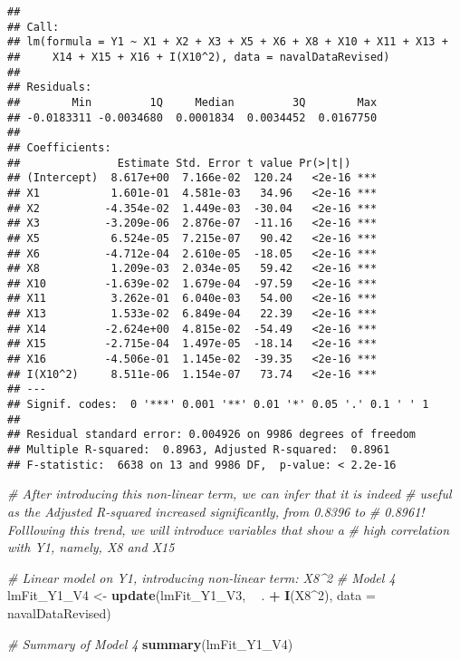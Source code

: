 \documentclass[
]{article}
\newenvironment{Shaded}{\begin{snugshade}}{\end{snugshade}}
\newcommand{\CommentTok}[1]{\textcolor[rgb]{0.56,0.35,0.01}{\textit{#1}}}
\newcommand{\DataTypeTok}[1]{\textcolor[rgb]{0.13,0.29,0.53}{#1}}
\newcommand{\DecValTok}[1]{\textcolor[rgb]{0.00,0.00,0.81}{#1}}
\newcommand{\KeywordTok}[1]{\textcolor[rgb]{0.13,0.29,0.53}{\textbf{#1}}}
\newcommand{\NormalTok}[1]{#1}
\newcommand{\OperatorTok}[1]{\textcolor[rgb]{0.81,0.36,0.00}{\textbf{#1}}}
\newcommand{\StringTok}[1]{\textcolor[rgb]{0.31,0.60,0.02}{#1}}
\begin{document}
\begin{verbatim}
## 
## Call:
## lm(formula = Y1 ~ X1 + X2 + X3 + X5 + X6 + X8 + X10 + X11 + X13 + 
##     X14 + X15 + X16 + I(X10^2), data = navalDataRevised)
## 
## Residuals:
##        Min         1Q     Median         3Q        Max 
## -0.0183311 -0.0034680  0.0001834  0.0034452  0.0167750 
## 
## Coefficients:
##               Estimate Std. Error t value Pr(>|t|)    
## (Intercept)  8.617e+00  7.166e-02  120.24   <2e-16 ***
## X1           1.601e-01  4.581e-03   34.96   <2e-16 ***
## X2          -4.354e-02  1.449e-03  -30.04   <2e-16 ***
## X3          -3.209e-06  2.876e-07  -11.16   <2e-16 ***
## X5           6.524e-05  7.215e-07   90.42   <2e-16 ***
## X6          -4.712e-04  2.610e-05  -18.05   <2e-16 ***
## X8           1.209e-03  2.034e-05   59.42   <2e-16 ***
## X10         -1.639e-02  1.679e-04  -97.59   <2e-16 ***
## X11          3.262e-01  6.040e-03   54.00   <2e-16 ***
## X13          1.533e-02  6.849e-04   22.39   <2e-16 ***
## X14         -2.624e+00  4.815e-02  -54.49   <2e-16 ***
## X15         -2.715e-04  1.497e-05  -18.14   <2e-16 ***
## X16         -4.506e-01  1.145e-02  -39.35   <2e-16 ***
## I(X10^2)     8.511e-06  1.154e-07   73.74   <2e-16 ***
## ---
## Signif. codes:  0 '***' 0.001 '**' 0.01 '*' 0.05 '.' 0.1 ' ' 1
## 
## Residual standard error: 0.004926 on 9986 degrees of freedom
## Multiple R-squared:  0.8963, Adjusted R-squared:  0.8961 
## F-statistic:  6638 on 13 and 9986 DF,  p-value: < 2.2e-16
\end{verbatim}

\begin{Shaded}
\begin{Highlighting}[]
\CommentTok{# After introducing this non-linear term, we can infer that it is indeed}
\CommentTok{# useful as the Adjusted R-squared increased significantly, from 0.8396 to}
\CommentTok{# 0.8961! Folllowing this trend, we will introduce variables that show a}
\CommentTok{# high correlation with Y1, namely, X8 and X15}

\CommentTok{# Linear model on Y1, introducing non-linear term: X8^2}
\CommentTok{# Model 4}
\NormalTok{lmFit_Y1_V4 <-}\StringTok{ }\KeywordTok{update}\NormalTok{(lmFit_Y1_V3, }\OperatorTok{~}\StringTok{ }\NormalTok{. }\OperatorTok{+}\StringTok{ }\KeywordTok{I}\NormalTok{(X8}\OperatorTok{^}\DecValTok{2}\NormalTok{), }\DataTypeTok{data =}\NormalTok{ navalDataRevised)}

\CommentTok{# Summary of Model 4}
\KeywordTok{summary}\NormalTok{(lmFit_Y1_V4)}
\end{Highlighting}
\end{Shaded}
\end{document}
